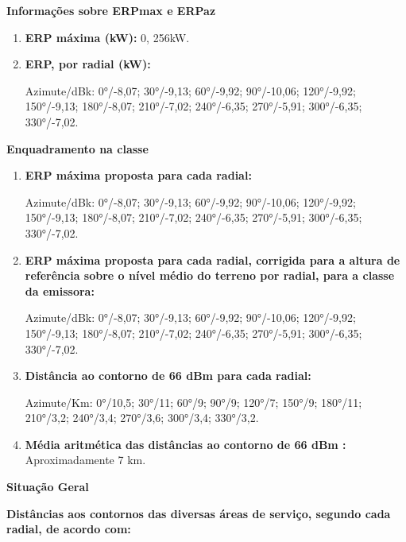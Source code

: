 \textbf{Informações sobre ERPmax e ERPaz}

\begin{enumerate}

\item \textbf{ERP máxima (kW):} 0, 256kW.

\item \textbf{ERP, por radial (kW):} 

Azimute/dBk: 0°/-8,07; 30°/-9,13; 60°/-9,92; 90°/-10,06; 120°/-9,92; 150°/-9,13; 180°/-8,07; 210°/-7,02; 240°/-6,35; 270°/-5,91; 300°/-6,35; 330°/-7,02.


\end{enumerate}

\textbf{Enquadramento na classe}

\begin{enumerate}

\item \textbf{ERP máxima proposta para cada radial:}

Azimute/dBk: 0°/-8,07; 30°/-9,13; 60°/-9,92; 90°/-10,06; 120°/-9,92; 150°/-9,13; 180°/-8,07; 210°/-7,02; 240°/-6,35; 270°/-5,91; 300°/-6,35; 330°/-7,02.

\item \textbf{ERP máxima proposta para cada radial, corrigida para a altura de referência sobre o nível médio do terreno por radial, para a classe da emissora:}

Azimute/dBk: 0°/-8,07; 30°/-9,13; 60°/-9,92; 90°/-10,06; 120°/-9,92; 150°/-9,13; 180°/-8,07; 210°/-7,02; 240°/-6,35; 270°/-5,91; 300°/-6,35; 330°/-7,02.

\item \textbf{Distância ao contorno de 66 dBm para cada radial:}

Azimute/Km: 0°/10,5; 30°/11; 60°/9; 90°/9; 120°/7; 150°/9; 180°/11; 210°/3,2; 240°/3,4; 270°/3,6; 300°/3,4; 330°/3,2.

\item \textbf{Média aritmética das distâncias ao contorno de 66 dBm :} Aproximadamente 7 km.

\end{enumerate}

\textbf{Situação Geral}

\textbf{Distâncias aos contornos das diversas áreas de serviço, segundo cada radial, de acordo com:}

